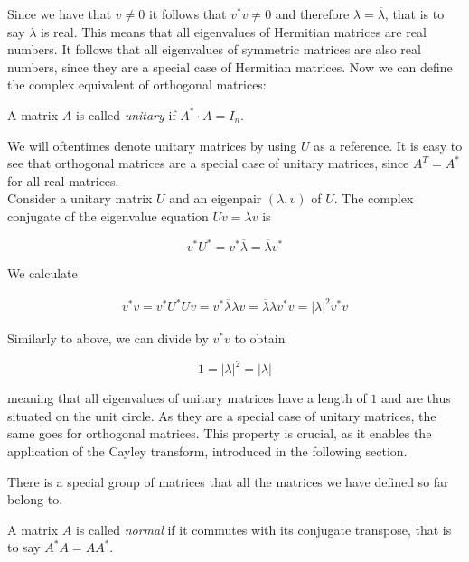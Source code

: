 Since we have that $v \neq 0$ it follows that $v^* v \neq 0$
and therefore $\lambda = \overline{\lambda}$, that is to say $\lambda$ is real.
This means that all eigenvalues of Hermitian matrices are real numbers.
It follows that all eigenvalues of symmetric matrices are also real numbers,
since they are a special case of Hermitian matrices.
Now we can define the complex equivalent of orthogonal matrices:

\begin{definition}
    A matrix $A$ is called \emph{unitary} if $A^* \cdot A = I_n$.
\end{definition}

We will oftentimes denote unitary matrices by using $U$ as a reference.
It is easy to see that orthogonal matrices are a special case of unitary matrices,
since $A^T = A^*$ for all real matrices.\\
Consider a unitary matrix $U$ and an eigenpair $(\lambda, v)$ of $U$.
The complex conjugate of the eigenvalue equation $U v = \lambda v$ is

\begin{equation} \label{eq:eigenvalue_equation_complex_conjugate}
    v^* U^* = v^* \overline{\lambda} = \overline{\lambda} v^*
\end{equation}

We calculate

\begin{align*}
    v^* v = v^* U^* U v = v^* \overline{\lambda} \lambda v = \overline{\lambda} \lambda v^* v = \left| \lambda \right|^2 v^* v
\end{align*}

Similarly to above, we can divide by $v^* v$ to obtain

\begin{equation} \label{eq:unitary_eigenvalues}
    1 = \left| \lambda \right|^2 = \left| \lambda \right|
\end{equation}

meaning that all eigenvalues of unitary matrices have a length of $1$ and are thus situated on the unit circle.
As they are a special case of unitary matrices, the same goes for orthogonal matrices.
This property is crucial, as it enables the application of the Cayley transform,
introduced in the following section.

There is a special group of matrices that all the matrices we have defined so far belong to.

\begin{definition}
    A matrix $A$ is called \emph{normal} if it commutes with its conjugate transpose,
    that is to say $A^* A = A A^*$.
\end{definition}


